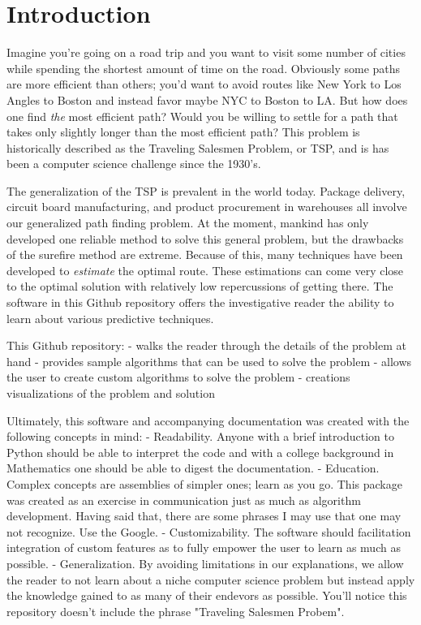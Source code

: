 \documentclass[12pt]{article}
\begin{document}


\section{Introduction}

Imagine you're going on a road trip and you want to visit some number of cities while spending the shortest amount of time on the road.  Obviously some paths are more efficient than others; you'd want to avoid routes like New York to Los Angles to Boston and instead favor maybe NYC to Boston to LA.  But how does one find \textit{the} most efficient path?  Would you be willing to settle for a path that takes only slightly longer than the most efficient path?  This problem is historically described as the Traveling Salesmen Problem, or TSP, and is has been a computer science challenge since the 1930's.

The generalization of the TSP is prevalent in the world today. Package delivery, circuit board manufacturing, and product procurement in warehouses all involve our generalized path finding problem.  At the moment, mankind has only developed one reliable method to solve this general problem, but the drawbacks of the surefire method are extreme.  Because of this, many techniques have been developed to \textit{estimate} the optimal route.  These estimations can come very close to the optimal solution with relatively low repercussions of getting there.  The software in this Github repository offers the investigative reader the ability to learn about various predictive techniques.

This Github repository:
- walks the reader through the details of the problem at hand
- provides sample algorithms that can be used to solve the problem
- allows the user to create custom algorithms to solve the problem
- creations visualizations of the problem and solution

Ultimately, this software and accompanying documentation was created with the following concepts in mind:
- Readability.  Anyone with a brief introduction to Python should be able to interpret the code and with a college background in Mathematics one should be able to digest the documentation.
- Education.  Complex concepts are assemblies of simpler ones; learn as you go.  This package was created as an exercise in communication just as much as algorithm development.  Having said that, there are some phrases I may use that one may not recognize.  Use the Google.
- Customizability.  The software should facilitation integration of custom features as to fully empower the user to learn as much as possible.
- Generalization.  By avoiding limitations in our explanations, we allow the reader to not learn about a niche computer science problem but instead apply the knowledge gained to as many of their endevors as possible.  You'll notice this repository doesn't include the phrase "Traveling Salesmen Probem".  
\end{document}
